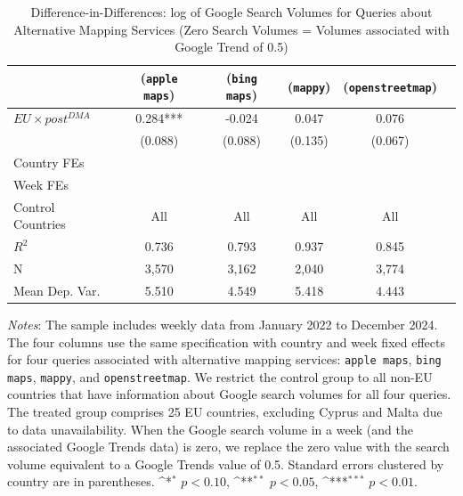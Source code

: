 \documentclass[11pt]{article}
\begin{document}
	\clearpage
	
	\clearpage
	
	\begin{table}
		\centering
		\def\sym#1{\ifmmode^{#1}\else\(^{#1}\)\fi}
		\caption{\label{tab:did_competitor1} Difference-in-Differences: log of Google Search Volumes for Queries about Alternative Mapping Services (Zero Search Volumes = Volumes associated with Google Trend of 0.5)}
		\begin{threeparttable}
			\begin{tabular}{lccccc}
				\hline \noalign{\smallskip} 
			
			&(\texttt{apple maps})   &(\texttt{bing maps})   &(\texttt{mappy})   &(\texttt{openstreetmap})   \\
			\midrule
			$ EU \times post^{DMA} $ &       0.284***&      -0.024   &       0.047   &       0.076   \\
			&     (0.088)   &     (0.088)   &     (0.135)   &     (0.067)   \\
			
			Country FEs         &  \checkmark   &  \checkmark   &  \checkmark   &  \checkmark   \\
			Week FEs            &  \checkmark   &  \checkmark   &  \checkmark   &  \checkmark   \\
			Control Countries   &         All   &         All   &         All   &         All   \\
			$ R ^2 $            &       0.736   &       0.793   &       0.937   &       0.845   \\
			N                   &       3,570   &       3,162   &       2,040   &       3,774   \\
			Mean Dep. Var.      &       5.510   &       4.549   &       5.418   &       4.443   \\
			\midrule
			
			\end{tabular}
			
			\begin{tablenotes}
				\item \footnotesize \emph{Notes}: The sample includes weekly data from January 2022 to December 2024. The four columns use the same specification with country and week fixed effects for four queries associated with alternative mapping services: \texttt{apple maps}, \texttt{bing maps}, \texttt{mappy}, and \texttt{openstreetmap}. We restrict the control group to all non-EU countries that have information about Google search volumes for all four queries. The treated group comprises 25 EU countries, excluding Cyprus and Malta due to data unavailability. When the Google search volume in a week (and the associated Google Trends data) is zero, we replace the zero value with the search volume equivalent to a Google Trends value of 0.5. Standard errors clustered by country are in parentheses. \sym{*} \(p<0.10\), \sym{**} \(p<0.05\), \sym{***}  \(p<0.01\).   
			\end{tablenotes}
		\end{threeparttable}
	\end{table}
	
\end{document}
